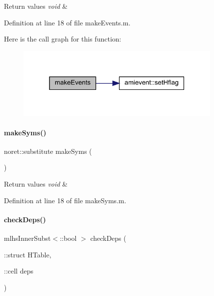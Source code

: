 \begin{DoxyRetVals}{Return values}
{\em void} & \\
\hline
\end{DoxyRetVals}


Definition at line 18 of file make\+Events.\+m.

Here is the call graph for this function\+:
\nopagebreak
\begin{figure}[H]
\begin{center}
\leavevmode
\includegraphics[width=286pt]{classamimodel_a4d4b20c81af6d7ed977b6b818c7b22db_cgraph}
\end{center}
\end{figure}
\mbox{\label{classamimodel_a5aba9155145df4b3f70bfec887c25af9}} 
\paragraph{\texorpdfstring{make\+Syms()}{makeSyms()}}
{\footnotesize\ttfamily noret\+::substitute make\+Syms (\begin{DoxyParamCaption}{ }\end{DoxyParamCaption})}


\begin{DoxyRetVals}{Return values}
{\em void} & \\
\hline
\end{DoxyRetVals}


Definition at line 18 of file make\+Syms.\+m.

\mbox{\label{classamimodel_ab566026e57f6cbce21a2a2c72b9f7f2b}} 
\paragraph{\texorpdfstring{check\+Deps()}{checkDeps()}}
{\footnotesize\ttfamily mlhs\+Inner\+Subst$<$\+::bool $>$ check\+Deps (\begin{DoxyParamCaption}\item[{\+::struct}]{H\+Table,  }\item[{\+::cell}]{deps }\end{DoxyParamCaption})}



